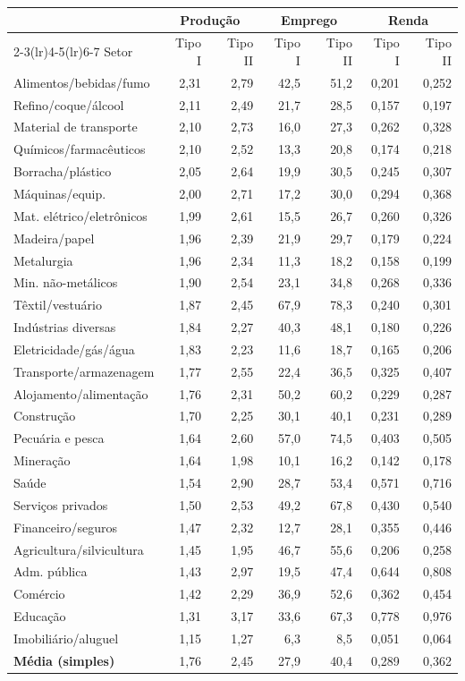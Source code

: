 \begin{tabular}{lrrrrrr}
\toprule
& \multicolumn{2}{c}{Produção} & \multicolumn{2}{c}{Emprego} & \multicolumn{2}{c}{Renda}\\
\cmidrule(lr){2-3}\cmidrule(lr){4-5}\cmidrule(lr){6-7}
Setor & Tipo I & Tipo II & Tipo I & Tipo II & Tipo I & Tipo II\\
\midrule
Alimentos/bebidas/fumo & 2,31 & 2,79 & 42,5 & 51,2 & 0,201 & 0,252\\
Refino/coque/álcool & 2,11 & 2,49 & 21,7 & 28,5 & 0,157 & 0,197\\
Material de transporte & 2,10 & 2,73 & 16,0 & 27,3 & 0,262 & 0,328\\
Químicos/farmacêuticos & 2,10 & 2,52 & 13,3 & 20,8 & 0,174 & 0,218\\
Borracha/plástico & 2,05 & 2,64 & 19,9 & 30,5 & 0,245 & 0,307\\
Máquinas/equip. & 2,00 & 2,71 & 17,2 & 30,0 & 0,294 & 0,368\\
Mat. elétrico/eletrônicos & 1,99 & 2,61 & 15,5 & 26,7 & 0,260 & 0,326\\
Madeira/papel & 1,96 & 2,39 & 21,9 & 29,7 & 0,179 & 0,224\\
Metalurgia & 1,96 & 2,34 & 11,3 & 18,2 & 0,158 & 0,199\\
Min. não-metálicos & 1,90 & 2,54 & 23,1 & 34,8 & 0,268 & 0,336\\
Têxtil/vestuário & 1,87 & 2,45 & 67,9 & 78,3 & 0,240 & 0,301\\
Indústrias diversas & 1,84 & 2,27 & 40,3 & 48,1 & 0,180 & 0,226\\
Eletricidade/gás/água & 1,83 & 2,23 & 11,6 & 18,7 & 0,165 & 0,206\\
Transporte/armazenagem & 1,77 & 2,55 & 22,4 & 36,5 & 0,325 & 0,407\\
Alojamento/alimentação & 1,76 & 2,31 & 50,2 & 60,2 & 0,229 & 0,287\\
Construção & 1,70 & 2,25 & 30,1 & 40,1 & 0,231 & 0,289\\
Pecuária e pesca & 1,64 & 2,60 & 57,0 & 74,5 & 0,403 & 0,505\\
Mineração & 1,64 & 1,98 & 10,1 & 16,2 & 0,142 & 0,178\\
Saúde & 1,54 & 2,90 & 28,7 & 53,4 & 0,571 & 0,716\\
Serviços privados & 1,50 & 2,53 & 49,2 & 67,8 & 0,430 & 0,540\\
Financeiro/seguros & 1,47 & 2,32 & 12,7 & 28,1 & 0,355 & 0,446\\
Agricultura/silvicultura & 1,45 & 1,95 & 46,7 & 55,6 & 0,206 & 0,258\\
Adm. pública & 1,43 & 2,97 & 19,5 & 47,4 & 0,644 & 0,808\\
Comércio & 1,42 & 2,29 & 36,9 & 52,6 & 0,362 & 0,454\\
Educação & 1,31 & 3,17 & 33,6 & 67,3 & 0,778 & 0,976\\
Imobiliário/aluguel & 1,15 & 1,27 & 6,3 & 8,5 & 0,051 & 0,064\\
\midrule
\textbf{Média (simples)} & 1,76 & 2,45 & 27,9 & 40,4 & 0,289 & 0,362\\
\bottomrule
\end{tabular}
